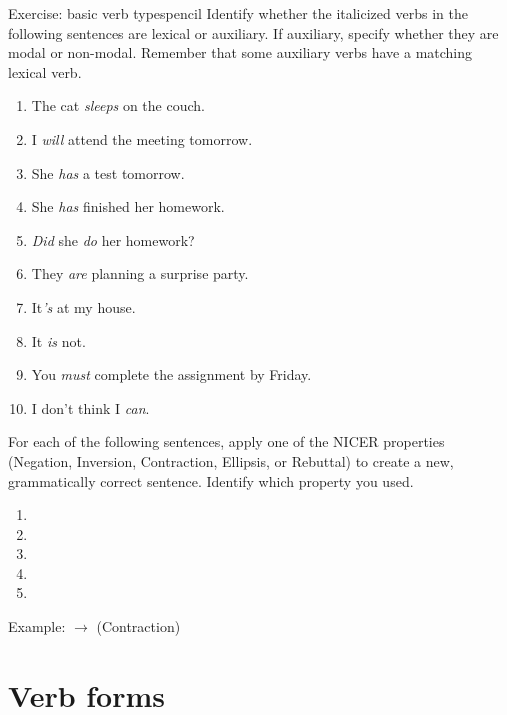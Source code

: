 \begin{tblsframedsymbol}{Exercise: basic verb types}{pencil}
Identify whether the italicized verbs in the following sentences are lexical or auxiliary. If auxiliary, specify whether they are modal or non-modal. Remember that some auxiliary verbs have a matching lexical verb.

\begin{enumerate}[nosep, leftmargin=*]
    \item The cat \emph{sleeps} on the couch.
    \item I \emph{will} attend the meeting tomorrow.
    \item She \emph{has} a test tomorrow.
    \item She \emph{has} finished her homework.
    \item \emph{Did} she \emph{do} her homework?
    \item They \emph{are} planning a surprise party.
    \item It\emph{'s} at my house.
    \item It \emph{is} not.
    \item You \emph{must} complete the assignment by Friday.
    \item I don't think I \emph{can}.
\end{enumerate}
For each of the following sentences, apply one of the NICER properties (Negation, Inversion, Contraction, Ellipsis, or Rebuttal) to create a new, grammatically correct sentence. Identify which property you used.

\begin{enumerate}[nosep, leftmargin=*]
    \item {}
    \item {}
    \item {}
    \item {}
    \item {}
\end{enumerate}

Example:  $\rightarrow$  (Contraction)
\end{tblsframedsymbol}

\section{Verb forms}\label{sec:verb-forms}

